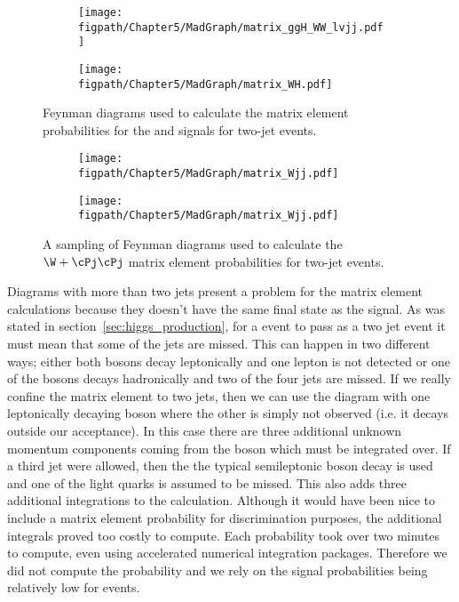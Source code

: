 \begin{figure}[!hbt]
    \centering
    \begin{subfigure}[t]{0.48\textwidth}
        \texttt{[image: \\figpath/Chapter5/MadGraph/matrix\_ggH\_WW\_lvjj.pdf]}
    \end{subfigure}
    \begin{subfigure}[t]{0.48\textwidth}
        \texttt{[image: \\figpath/Chapter5/MadGraph/matrix\_WH.pdf]}
    \end{subfigure}
    \caption{Feynman diagrams used to calculate the matrix element probabilities for the \ggH and \WH signals for two-jet events.}
    \label{fig:MadGraph5_example_signal}
\end{figure}

\begin{figure}[!hbt]
    \centering
    \begin{subfigure}[t]{0.9\textwidth}
        \texttt{[image: \\figpath/Chapter5/MadGraph/matrix\_Wjj.pdf]}
    \end{subfigure}

    \begin{subfigure}[t]{0.9\textwidth}
        \texttt{[image: \\figpath/Chapter5/MadGraph/matrix\_Wjj.pdf]}
    \end{subfigure}
    \caption{A sampling of Feynman diagrams used to calculate the $\W+\cPj\cPj$ matrix element probabilities for two-jet events.}
    \label{fig:MadGraph5_example_Wjj}
\end{figure}

Diagrams with more than two jets present a problem for the matrix element calculations because they doesn't have the same final state as the signal.
As was stated in section~\ref{sec:higgs_production}, for a \ttbar event to pass as a two jet event it must mean that some of the jets are missed.
This can happen in two different ways; either both \W bosons decay leptonically and one lepton is not detected or one of the \W bosons decays hadronically and two of the four jets are missed.
If we really confine the matrix element to two jets, then we can use the diagram with one leptonically decaying \W boson where the other \W is simply not observed (i.e. it decays outside our acceptance).
In this case there are three additional unknown momentum components coming from the \W boson which must be integrated over.
If a third jet were allowed, then the the typical semileptonic \W boson decay is used and one of the light quarks is assumed to be missed.
This also adds three additional integrations to the calculation.
Although it would have been nice to include a \ttbar matrix element probability for discrimination purposes, the additional integrals proved too costly to compute.
Each \ttbar probability took over two minutes to compute, even using accelerated numerical integration packages.
Therefore we did not compute the \ttbar probability and we rely on the signal probabilities being relatively low for \ttbar events.

